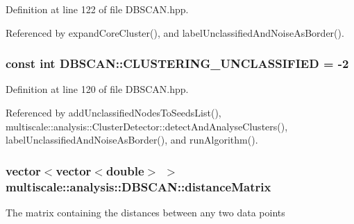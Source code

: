 Definition at line 122 of file D\-B\-S\-C\-A\-N.\-hpp.



Referenced by expand\-Core\-Cluster(), and label\-Unclassified\-And\-Noise\-As\-Border().

\hypertarget{classmultiscale_1_1analysis_1_1DBSCAN_a6f60961639281a807b63650faf01511b}{
\subsubsection[{C\-L\-U\-S\-T\-E\-R\-I\-N\-G\-\_\-\-U\-N\-C\-L\-A\-S\-S\-I\-F\-I\-E\-D}]{\setlength{\rightskip}{0pt plus 5cm}const int D\-B\-S\-C\-A\-N\-::\-C\-L\-U\-S\-T\-E\-R\-I\-N\-G\-\_\-\-U\-N\-C\-L\-A\-S\-S\-I\-F\-I\-E\-D = -\/2\hspace{0.3cm}{\ttfamily [static]}}}\label{classmultiscale_1_1analysis_1_1DBSCAN_a6f60961639281a807b63650faf01511b}


Definition at line 120 of file D\-B\-S\-C\-A\-N.\-hpp.



Referenced by add\-Unclassified\-Nodes\-To\-Seeds\-List(), multiscale\-::analysis\-::\-Cluster\-Detector\-::detect\-And\-Analyse\-Clusters(), label\-Unclassified\-And\-Noise\-As\-Border(), and run\-Algorithm().

\hypertarget{classmultiscale_1_1analysis_1_1DBSCAN_a863a8b90ff30d401795264a246a09147}{
\subsubsection[{distance\-Matrix}]{\setlength{\rightskip}{0pt plus 5cm}vector$<$vector$<$double$>$ $>$ multiscale\-::analysis\-::\-D\-B\-S\-C\-A\-N\-::distance\-Matrix\hspace{0.3cm}{\ttfamily [private]}}}\label{classmultiscale_1_1analysis_1_1DBSCAN_a863a8b90ff30d401795264a246a09147}
The matrix containing the distances between any two data points 

